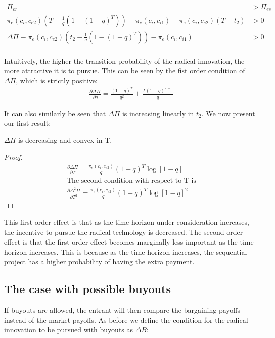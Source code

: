 \begin{align*}
\Pi_{er}  &> \Pi_{es}   \\
\pi_{e}(c_i,c_{e2}) \left( T - \frac{1}{q} \left( 1-(1-q)^{T} \right) \right) - \pi_e(c_i,c_{i1})  -\pi_e(c_i,c_{e2})(T-t_2) &> 0 \\
\Delta \Pi \equiv \pi_{e}(c_i,c_{e2}) \left( t_2 - \frac{1}{q} \left( 1-(1-q)^{T} \right) \right) - \pi_e(c_i,c_{i1})  &> 0 \\
\end{align*}

Intuitively, the higher the transition probability of the radical innovation, the more attractive it is to pursue. This can be seen by the fist order condition of $\Delta \Pi$, which is strictly positive: 
\begin{align*}
\frac{\partial \Delta \Pi}{\partial q} = \frac{(1-q)^T}{q^2}+\frac{T (1-q)^{T-1}}{q}
\end{align*} 

It can also similarly be seen that $\Delta \Pi$ is increasing linearly in $t_2$. We now present our first result:  

\begin{proposition}
$\Delta \Pi$ is decreasing and convex in T.
\end{proposition}

\begin{proof}
\begin{align*}
\frac{\partial \Delta \Pi}{\partial T}=\frac{\pi_{e}(c_i,c_{e2})}{q} (1-q)^{T} \log[1-q] \\
\text{The second condition with respect to T is} \\
\frac{\partial \Delta^2 \Pi}{\partial T^2} = \frac{\pi_{e}(c_i,c_{e2})}{q} (1-q)^{T} \log[1-q]^2
\end{align*}
\end{proof}

This first order effect is that as the time horizon under consideration increases, the incentive to pursue the radical technology is decreased. The second order effect is that the first order effect becomes marginally less important as the time horizon increases. This is because as the time horizon increases, the sequential project has a higher probability of having the extra payment. 

\subsection{The case with possible buyouts}
If buyouts are allowed, the entrant will then compare the bargaining payoffs instead of the market payoffs. As before we define the condition for the radical innovation to be pursued with buyouts as $\Delta B$: 

